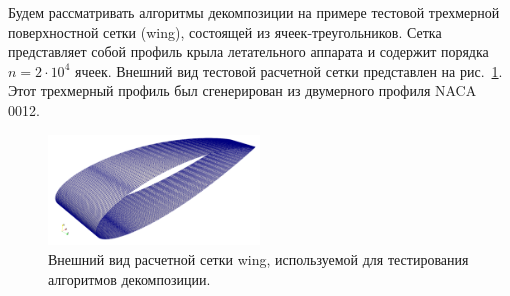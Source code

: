 Будем рассматривать алгоритмы декомпозиции на примере тестовой трехмерной поверхностной сетки (wing), состоящей из ячеек-треугольников.
Сетка представляет собой профиль крыла летательного аппарата и содержит порядка $n = 2 \cdot 10^4$ ячеек.
Внешний вид тестовой расчетной сетки представлен на рис.~\ref{fig:text_2_decompsurf_wing_grid}.
Этот трехмерный профиль был сгенерирован из двумерного профиля NACA 0012.

\begin{figure}[ht]
\centering
\includegraphics[width=0.5\textwidth]{./pics/text_2_decompsurf/wing_grid.png}
\singlespacing
{}\caption{Внешний вид расчетной сетки wing, используемой для тестирования алгоритмов декомпозиции.}
\label{fig:text_2_decompsurf_wing_grid}
\end{figure}

